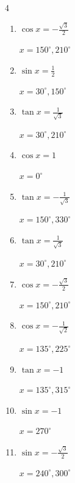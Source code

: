 \begin{multicols}{4}
\begin{enumerate}
        $\displaystyle x = 210^{\circ} , 330^{\circ}$

  \item $\displaystyle \cos{x}  = -\frac{\sqrt{3}}{2}$

        $\displaystyle x = 150^{\circ} , 210^{\circ}$

  \item $\displaystyle \sin{x}  = \frac{1}{2}$

        $\displaystyle x = 30^{\circ} , 150^{\circ}$

  \item $\displaystyle \tan{x}  = \frac{1}{\sqrt{3}}$

        $\displaystyle x = 30^{\circ} , 210^{\circ}$

  \item $\displaystyle \cos{x}  = 1$

        $\displaystyle x = 0^{\circ}$

  \item $\displaystyle \tan{x}  = -\frac{1}{\sqrt{3}}$

        $\displaystyle x = 150^{\circ} , 330^{\circ}$

\columnbreak %

  \item $\displaystyle \tan{x}  = \frac{1}{\sqrt{3}}$

        $\displaystyle x = 30^{\circ} , 210^{\circ}$

  \item $\displaystyle \cos{x}  = -\frac{\sqrt{3}}{2}$

        $\displaystyle x = 150^{\circ} , 210^{\circ}$

  \item $\displaystyle \cos{x}  = -\frac{1}{\sqrt{2}}$

        $\displaystyle x = 135^{\circ} , 225^{\circ}$

  \item $\displaystyle \tan{x}  = -1$

        $\displaystyle x = 135^{\circ} , 315^{\circ}$

  \item $\displaystyle \sin{x}  = -1$

        $\displaystyle x = 270^{\circ}$

  \item $\displaystyle \sin{x}  = -\frac{\sqrt{3}}{2}$

        $\displaystyle x = 240^{\circ} , 300^{\circ}$


\end{enumerate}
\end{multicols}

